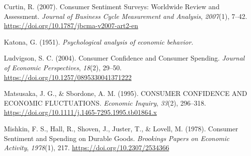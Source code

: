 \documentclass[
  12pt,
  a4paper,
  abstract]{scrartcl}
\newlength{\cslhangindent}
\newenvironment{CSLReferences}[2] %
 {\begin{list}{}{%
  \setlength{\itemindent}{0pt}
  \setlength{\leftmargin}{0pt}
  \setlength{\parsep}{0pt}
  \ifodd #1
   \setlength{\leftmargin}{\cslhangindent}
   \setlength{\itemindent}{-1\cslhangindent}
  \fi
  \setlength{\itemsep}{#2\baselineskip}}}
 {\end{list}}
\begin{document}
\label{refs}
\begin{CSLReferences}{1}{0}
Curtin, R. (2007). Consumer {Sentiment} {Surveys}: {Worldwide} {Review}
and {Assessment}. \emph{Journal of Business Cycle Measurement and
Analysis}, \emph{2007}(1), 7--42.
\url{https://doi.org/10.1787/jbcma-v2007-art2-en}

Katona, G. (1951). \emph{Psychological analysis of economic behavior.}

Ludvigson, S. C. (2004). Consumer {Confidence} and {Consumer}
{Spending}. \emph{Journal of Economic Perspectives}, \emph{18}(2),
29--50. \url{https://doi.org/10.1257/0895330041371222}

Matsusaka, J. G., \& Sbordone, A. M. (1995). {CONSUMER} {CONFIDENCE}
{AND} {ECONOMIC} {FLUCTUATIONS}. \emph{Economic Inquiry}, \emph{33}(2),
296--318. \url{https://doi.org/10.1111/j.1465-7295.1995.tb01864.x}

Mishkin, F. S., Hall, R., Shoven, J., Juster, T., \& Lovell, M. (1978).
Consumer {Sentiment} and {Spending} on {Durable} {Goods}.
\emph{Brookings Papers on Economic Activity}, \emph{1978}(1), 217.
\url{https://doi.org/10.2307/2534366}

\end{CSLReferences}
\end{document}
